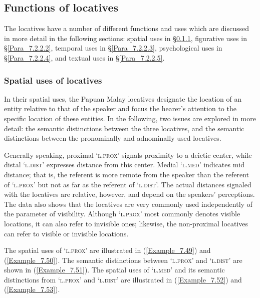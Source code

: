 {\subsection{Functions of locatives}
\label{Para_7.2.2}
The locatives have a number of different functions and uses which are discussed in more detail in the following sections: spatial uses in §\ref{Para_7.2.2.1}, figurative  uses in §\ref{Para_7.2.2.2}, temporal uses in §\ref{Para_7.2.2.3}, psychological uses in §\ref{Para_7.2.2.4}, and textual uses in §\ref{Para_7.2.2.5}.


\subsubsection[Spatial uses of locatives]{Spatial uses of locatives}
\label{Para_7.2.2.1}
In their spatial uses, the Papuan Malay locatives designate the location of an entity relative to that of the speaker and focus the hearer’s attention to the specific location of these entities. In the following, two issues are explored in more detail: the semantic distinctions between the three locatives, and the semantic distinctions between the pronominally and adnominally used locatives.



Generally speaking, proximal  ‘\textsc{l.prox}’ signals proximity to a deictic center, while distal  ‘\textsc{l.dist}’ expresses distance from this center. Medial  ‘\textsc{l.med}’ indicates mid distance; that is, the referent is more remote from the speaker than the referent of  ‘\textsc{l.prox}’ but not as far as the referent of  ‘\textsc{l.dist}’. The actual distances signaled with the locatives are relative, however, and depend on the speakers’ perceptions. The data also shows that the locatives are very commonly used independently of the parameter of visibility. Although  ‘\textsc{l.prox}’ most commonly denotes visible locations, it can also refer to invisible ones; likewise, the non-proximal locatives can refer to visible or invisible locations.



The spatial uses of  ‘\textsc{l.prox}’ are illustrated in (\ref{Example_7.49}) and (\ref{Example_7.50}). The semantic distinctions between  ‘\textsc{l.prox}’ and  ‘\textsc{l.dist}’ are shown in (\ref{Example_7.51}). The spatial uses of  ‘\textsc{l.med}’ and its semantic distinctions from  ‘\textsc{l.prox}’ and  ‘\textsc{l.dist}’ are illustrated in (\ref{Example_7.52}) and (\ref{Example_7.53}).



}
